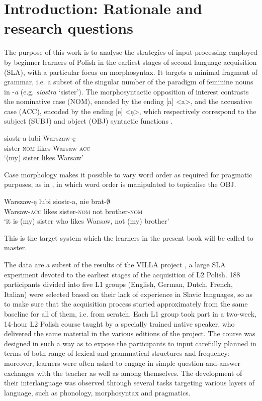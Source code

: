 \chapter{Introduction: Rationale and research questions}\label{sec:1}

The purpose of this work is to analyse the strategies of input processing employed by beginner learners of Polish in the earliest stages of second language acquisition (SLA), with a particular focus on morphosyntax. It targets a minimal fragment of grammar, i.e. a subset of the singular number of the paradigm of feminine nouns in -\textit{a} (e.g. \textit{siostra} ‘sister’). The morphosyntactic opposition of interest contrasts the nominative case (NOM), encoded by the ending [a] <a>, and the accusative case (ACC), encoded by the ending [e] <ę>, which respectively correspond to the subject (SUBJ) and object (OBJ) syntactic functions .

\ea%
    \label{ex:01:1}
    \gll    siostr-a lubi Warszaw-ę\\
            sister-\textsc{nom} likes Warsaw-\textsc{acc}\\
    \glt    ‘(my) sister likes Warsaw’
    \z

Case morphology makes it possible to vary word order as required for pragmatic purposes, as in , in which word order is manipulated to topicalise the OBJ. 

\ea%
    \label{ex:01:2}
    \gll    Warszaw-ę   lubi   siostr-a,   nie  brat-${\emptyset}$\\
            Warsaw-\textsc{acc}  likes  sister-\textsc{nom}  not  brother-\textsc{nom}\\
    \glt    ‘it is (my) sister who likes Warsaw, not (my) brother’
    \z

This is the target system which the learners in the present book will be called to master. 

The data are a subset of the results of the VILLA project \citep{DimrothEtAl2013}, a large SLA experiment devoted to the earliest stages of the acquisition of L2 Polish. 188 participants divided into five L1 groups (English, German, Dutch, French, Italian) were selected based on their lack of experience in Slavic languages, so as to make sure that the acquisition process started approximately from the same baseline for all of them, i.e. from scratch. Each L1 group took part in a two-week, 14-hour L2 Polish course taught by a specially trained native speaker, who delivered the same material in the various editions of the project. The course was designed in such a way as to expose the participants to input carefully planned in terms of both range of lexical and grammatical structures and frequency; moreover, learners were often asked to engage in simple question-and-answer exchanges with the teacher as well as among themselves. The development of their interlanguage was observed through several tasks targeting various layers of language, such as phonology, morphosyntax and pragmatics.

